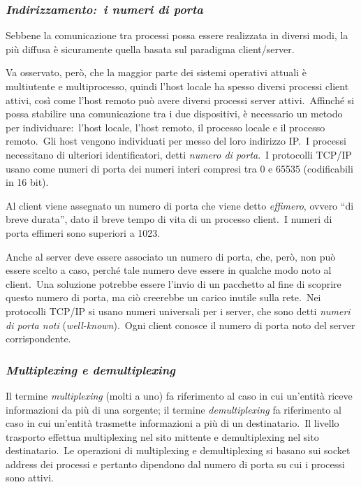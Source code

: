 \subsubsection{\emph{Indirizzamento:\ i numeri di porta}}

Sebbene la comunicazione tra processi possa essere realizzata in diversi modi, la più diffusa è sicuramente quella basata sul paradigma client/server.

Va osservato, però, che la maggior parte dei sistemi operativi attuali è multiutente e multiprocesso, quindi l'host locale ha spesso diversi processi client attivi, così come l'host remoto può avere diversi processi server attivi.\
Affinché si possa stabilire una comunicazione tra i due dispositivi, è necessario un metodo per individuare:\ l'host locale, l'host remoto, il processo locale e il processo remoto.\
Gli host vengono individuati per messo del loro indirizzo IP.\
I processi necessitano di ulteriori identificatori, detti \emph{numero di porta}.\
I protocolli TCP/IP usano come numeri di porta dei numeri interi compresi tra 0 e 65535 (codificabili in 16 bit).

Al client viene assegnato un numero di porta che viene detto \emph{effimero}, ovvero ``di breve durata'', dato il breve tempo di vita di un processo client.\
I numeri di porta effimeri sono superiori a 1023.

Anche al server deve essere associato un numero di porta, che, però, non può essere scelto a caso, perché tale numero deve essere in qualche modo noto al client.\
Una soluzione potrebbe essere l'invio di un pacchetto al fine di scoprire questo numero di porta, ma ciò creerebbe un carico inutile sulla rete.\
Nei protocolli TCP/IP si usano numeri universali per i server, che sono detti \emph{numeri di porta noti} (\emph{well-known}).\
Ogni client conosce il numero di porta noto del server corrispondente.

\subsubsection{\emph{Multiplexing e demultiplexing}}

Il termine \emph{multiplexing} (molti a uno) fa riferimento al caso in cui un'entità riceve informazioni da più di una sorgente; il termine \emph{demultiplexing} fa riferimento al caso in cui un'entità trasmette informazioni a più di un destinatario.\
Il livello trasporto effettua multiplexing nel sito mittente e demultiplexing nel sito destinatario.\
Le operazioni di multiplexing e demultiplexing si basano sui socket address dei processi e pertanto dipendono dal numero di porta su cui i processi sono attivi.

